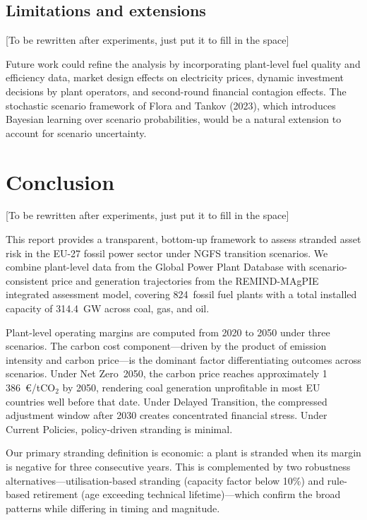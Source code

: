 \documentclass[a4paper, 12pt]{report}
\numberwithin{equation}{chapter}
\numberwithin{figure}{chapter}
\numberwithin{table}{chapter}
\begin{document}
\section{Limitations and extensions}

[To be rewritten after experiments, just put it to fill in the space]

Future work could refine the analysis by incorporating plant-level fuel quality and efficiency data, market design effects on electricity prices, dynamic investment decisions by plant operators, and second-round financial contagion effects. The stochastic scenario framework of Flora and Tankov (2023), which introduces Bayesian learning over scenario probabilities, would be a natural extension to account for scenario uncertainty.


\chapter*{Conclusion}

[To be rewritten after experiments, just put it to fill in the space]

This report provides a transparent, bottom-up framework to assess stranded asset risk in the EU-27 fossil power sector under NGFS transition scenarios. We combine plant-level data from the Global Power Plant Database with scenario-consistent price and generation trajectories from the REMIND-MAgPIE integrated assessment model, covering 824~fossil fuel plants with a total installed capacity of 314.4~GW across coal, gas, and oil.

Plant-level operating margins are computed from 2020 to 2050 under three scenarios. The carbon cost component---driven by the product of emission intensity and carbon price---is the dominant factor differentiating outcomes across scenarios. Under Net Zero~2050, the carbon price reaches approximately 1\,386~\euro/tCO$_2$ by 2050, rendering coal generation unprofitable in most EU countries well before that date. Under Delayed Transition, the compressed adjustment window after 2030 creates concentrated financial stress. Under Current Policies, policy-driven stranding is minimal.

Our primary stranding definition is economic: a plant is stranded when its margin is negative for three consecutive years. This is complemented by two robustness alternatives---utilisation-based stranding (capacity factor below 10\%) and rule-based retirement (age exceeding technical lifetime)---which confirm the broad patterns while differing in timing and magnitude.
\end{document}

